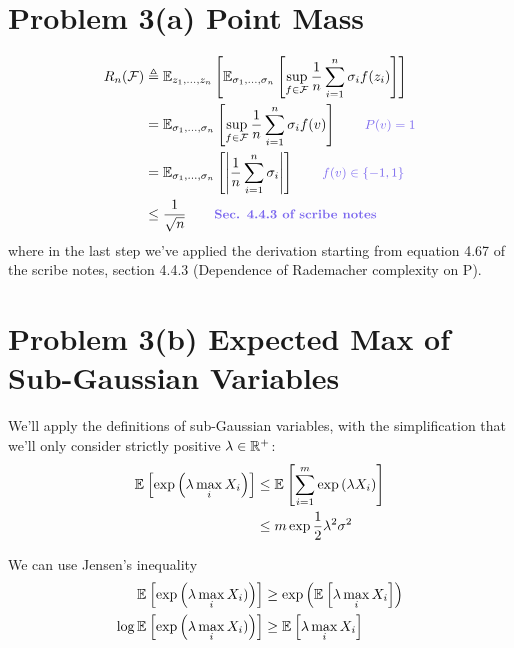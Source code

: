 \documentclass[11pt]{article}
\newcommand{\1}{\mathbb{I}} %
\begin{document}
\clearpage 
\section*{Problem 3(a) Point Mass}


\begin{align}
	R_n(\mathcal F)
		&\triangleq \E[z_1, \ldots, z_n]{ \E[\sigma_1, \ldots, \sigma_n]{ \sup_{f \in \mathcal F} \inv{n} \insum \sigma_i f(z_i)  } } \\
		&=  \E[\sigma_1, \ldots, \sigma_n]{ \sup_{f \in \mathcal F} \inv{n} \insum \sigma_i f(v)  } \qquad \mblue{P(v) = 1}\\
		&=   \E[\sigma_1, \ldots, \sigma_n]{  \left| \inv{n} \insum \sigma_i \right | } \qquad \mblue{f(v) \in \{-1, 1\}} \\
		&\leq \inv{\sqrt{n}} \qquad  \mtblue{Sec. 4.4.3 of scribe notes}
\end{align}
where in the last step we've applied the derivation starting from equation 4.67 of the scribe notes, section 4.4.3 (Dependence of Rademacher complexity on P). 


\clearpage 
\section*{Problem 3(b) Expected Max of Sub-Gaussian Variables}

We'll apply the definitions of sub-Gaussian variables, with the simplification that we'll only consider strictly positive $\lambda \in \mathbb{R}^+$: 
\begin{align}
	\mathbb{E}_{}\left[ \exp \left(  \lambda \max_i X_i  \right) \right] 
		&\leq \mathbb{E}_{}\left[ \sum_{i=1}^{m} \exp \left(  \lambda X_i  \right) \right] \\
		&\leq m \exp{\frac{1}{2}\lambda^2 \sigma^2}
\end{align}

We can use Jensen's inequality 
\begin{align}
	\mathbb{E}_{}\left[\exp\left( \lambda \max_i X_i) \right)  \right]
		&\geq \exp\left(    \mathbb{E}_{}\left[ \lambda \max_i X_i\right]   \right) \\
	\log \mathbb{E}_{}\left[\exp\left( \lambda \max_i X_i) \right)  \right]
	&\geq   \mathbb{E}_{}\left[ \lambda \max_i X_i\right]  \label{eq:3b-1}
\end{align}
\end{document}
